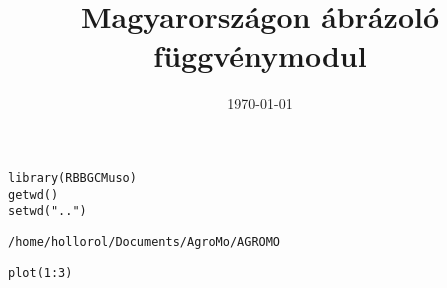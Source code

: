 \documentclass[11pt]{article}
\date{\today}
\title{Magyarországon ábrázoló függvénymodul}
\begin{document}
\maketitle
\tableofcontents

\begin{verbatim}
library(RBBGCMuso)
getwd()
setwd("..")
\end{verbatim}

\begin{verbatim}
/home/hollorol/Documents/AgroMo/AGROMO
\end{verbatim}

\begin{verbatim}
plot(1:3)
\end{verbatim}
\end{document}
